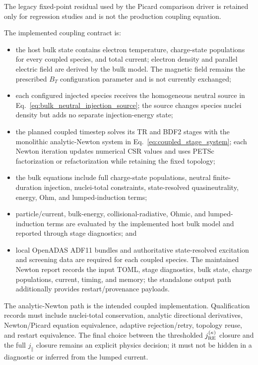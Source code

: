 \documentclass[11pt]{article}
\begin{document}
The legacy fixed-point residual used by the Picard comparison driver is retained only
for regression studies and is not the production coupling equation.

The implemented coupling contract is:
\begin{itemize}
  \item the host bulk state contains electron temperature, charge-state populations for
        every coupled species, and total current; electron density and parallel electric
        field are derived by the bulk model.  The magnetic field remains the prescribed
        $B_T$ configuration parameter and is not currently exchanged;
  \item each configured injected species receives the homogeneous neutral source in
        Eq.~\eqref{eq:bulk_neutral_injection_source}; the source changes species nuclei
        density but adds no separate injection-energy state;
  \item the planned coupled timestep solves its TR and BDF2 stages with the monolithic
        analytic-Newton system in Eq.~\eqref{eq:coupled_stage_system}; each Newton
        iteration updates numerical CSR values and uses PETSc factorization or
        refactorization while retaining the fixed topology;
  \item the bulk equations include full charge-state populations, neutral finite-duration
        injection, nuclei-total constraints, state-resolved quasineutrality, energy,
        Ohm, and lumped-induction terms;
  \item particle/current, bulk-energy, collisional-radiative, Ohmic, and lumped-induction
        terms are evaluated by the implemented host bulk model and reported through
        stage diagnostics; and
  \item local OpenADAS ADF11 bundles and authoritative state-resolved excitation and
        screening data are required for each coupled species.  The maintained Newton
        report records the input TOML, stage diagnostics, bulk state, charge populations,
        current, timing, and memory; the standalone output path additionally provides
        restart/provenance payloads.
\end{itemize}

The analytic-Newton path is the intended coupled implementation.  Qualification records
must include nuclei-total conservation, analytic directional derivatives, Newton/Picard
equation equivalence, adaptive rejection/retry, topology reuse, and restart equivalence.
The final choice between the thresholded $j_{\rm RE}^{(\kappa)}$ closure and the full
$j_\parallel$ closure remains an explicit physics decision; it must not be hidden in a
diagnostic or inferred from the lumped current.
\end{document}

